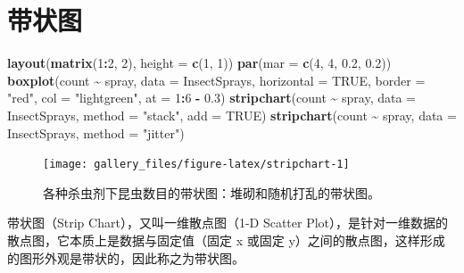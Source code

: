 \documentclass[
  b5paper,
  UTF8,twoside]{book}
\newenvironment{Shaded}{\begin{snugshade}}{\end{snugshade}}
\newcommand{\AttributeTok}[1]{\textcolor[rgb]{0.13,0.29,0.53}{#1}}
\newcommand{\ConstantTok}[1]{\textcolor[rgb]{0.56,0.35,0.01}{#1}}
\newcommand{\DecValTok}[1]{\textcolor[rgb]{0.00,0.00,0.81}{#1}}
\newcommand{\FloatTok}[1]{\textcolor[rgb]{0.00,0.00,0.81}{#1}}
\newcommand{\FunctionTok}[1]{\textcolor[rgb]{0.13,0.29,0.53}{\textbf{#1}}}
\newcommand{\NormalTok}[1]{#1}
\newcommand{\SpecialCharTok}[1]{\textcolor[rgb]{0.81,0.36,0.00}{\textbf{#1}}}
\newcommand{\StringTok}[1]{\textcolor[rgb]{0.31,0.60,0.02}{#1}}
\begin{document}
\section{带状图}\label{sec:stripchart}





\begin{Shaded}
\begin{Highlighting}[]
\FunctionTok{layout}\NormalTok{(}\FunctionTok{matrix}\NormalTok{(}\DecValTok{1}\SpecialCharTok{:}\DecValTok{2}\NormalTok{, }\DecValTok{2}\NormalTok{), }\AttributeTok{height =} \FunctionTok{c}\NormalTok{(}\DecValTok{1}\NormalTok{, }\DecValTok{1}\NormalTok{))}
\FunctionTok{par}\NormalTok{(}\AttributeTok{mar =} \FunctionTok{c}\NormalTok{(}\DecValTok{4}\NormalTok{, }\DecValTok{4}\NormalTok{, }\FloatTok{0.2}\NormalTok{, }\FloatTok{0.2}\NormalTok{))}
\FunctionTok{boxplot}\NormalTok{(count }\SpecialCharTok{\textasciitilde{}}\NormalTok{ spray, }\AttributeTok{data =}\NormalTok{ InsectSprays, }\AttributeTok{horizontal =} \ConstantTok{TRUE}\NormalTok{, }
        \AttributeTok{border =} \StringTok{"red"}\NormalTok{, }\AttributeTok{col =} \StringTok{"lightgreen"}\NormalTok{, }\AttributeTok{at =} \DecValTok{1}\SpecialCharTok{:}\DecValTok{6} \SpecialCharTok{{-}} \FloatTok{0.3}\NormalTok{)}
\FunctionTok{stripchart}\NormalTok{(count }\SpecialCharTok{\textasciitilde{}}\NormalTok{ spray, }\AttributeTok{data =}\NormalTok{ InsectSprays, }\AttributeTok{method =} \StringTok{"stack"}\NormalTok{, }\AttributeTok{add =} \ConstantTok{TRUE}\NormalTok{)}
\FunctionTok{stripchart}\NormalTok{(count }\SpecialCharTok{\textasciitilde{}}\NormalTok{ spray, }\AttributeTok{data =}\NormalTok{ InsectSprays, }\AttributeTok{method =} \StringTok{"jitter"}\NormalTok{)}
\end{Highlighting}
\end{Shaded}

\begin{figure}

{\centering \texttt{[image: gallery\_files/figure-latex/stripchart-1]} 

}

\caption[各种杀虫剂下昆虫数目的带状图]{各种杀虫剂下昆虫数目的带状图：堆砌和随机打乱的带状图。}\label{fig:stripchart}
\end{figure}

带状图（Strip Chart），又叫一维散点图（1-D Scatter Plot），是针对一维数据的散点图，它本质上是数据与固定值（固定 x 或固定 y）之间的散点图，这样形成的图形外观是带状的，因此称之为带状图。
\end{document}
